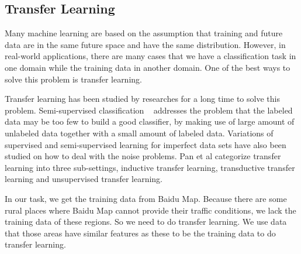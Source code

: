%
\subsection{Transfer Learning}
Many machine learning are based on the assumption that training and future data are in the same future space and have the same distribution. However, in real-world applications, there are many cases that we have a classification task in one domain while the training data in another domain. One of the best ways to solve this problem is transfer learning.


Transfer learning has been studied by researches for a long time to solve this problem. Semi-supervised classification ~\cite{14} addresses the problem that the labeled data may be too few to build a good classifier, by making use of large amount of unlabeled data together with a small amount of labeled data. Variations of supervised and semi-supervised learning for imperfect data sets have also been studied on how to deal with the noise problems. Pan et al \cite{Pan:Survey} categorize transfer learning into 
three sub-settings, inductive transfer learning, transductive transfer 
learning and unsupervised transfer learning. 


In our task, we get the training data from Baidu Map. Because there are some rural places where Baidu Map cannot provide their traffic conditions, we lack the training data of these regions. So we need to do transfer learning. We use data that those areas have similar features as these to be the training data to do transfer learning. 

